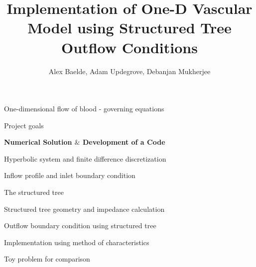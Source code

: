 \documentclass{beamer}
\title{Implementation of One-D Vascular Model using Structured Tree Outflow Conditions}
\author{Alex Baelde, Adam Updegrove, Debanjan Mukherjee}
\begin{document}
\begin{frame}
\maketitle
\end{frame}

\begin{frame}{One-dimensional flow of blood - governing equations}

\end{frame}

\begin{frame}{Project goals}

\end{frame}

\begin{frame}
	\begin{center}
		\Large{\textbf{Numerical Solution $\&$ Development of a Code}}
	\end{center}
\end{frame}

\begin{frame}{Hyperbolic system and finite difference discretization}

\end{frame}

\begin{frame}{Inflow profile and inlet boundary condition}

\end{frame}

\begin{frame}{The structured tree}

\end{frame}

\begin{frame}{Structured tree geometry and impedance calculation}

\end{frame}

\begin{frame}{Outflow boundary condition using structured tree}

\end{frame}

\begin{frame}{Implementation using method of characteristics}

\end{frame}

\begin{frame}{Toy problem for comparison}

\end{frame}
\end{document}
